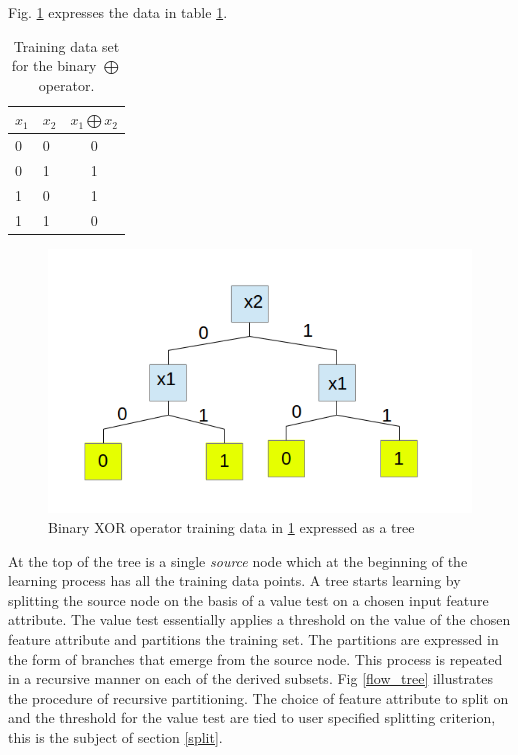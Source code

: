 \documentclass[final,3p,times,twocolumn]{elsarticle}
\begin{document}
Fig. \ref{simple_tree} expresses the data in table \ref{simple_train}. 

\begin{table}[ht]
\begin{center}
\begin{tabular}{l|l|c}
$x_{1}$ & $x_{2}$ & $ x_{1} \bigoplus x_{2}$\\
\hline
0 & 0 & 0 \\
0 & 1 & 1 \\ 
1 & 0 & 1 \\
1 & 1 & 0 
\end{tabular}
\end{center}
\caption{Training data set for the binary $\bigoplus$ operator.}
\label{simple_train}
\end{table}

\begin{figure}
\hspace{-1cm}
\includegraphics[scale=0.48]{Images/simple_tree.png}
\caption{Binary XOR operator training data in \ref{simple_train} expressed as a tree}
\label{simple_tree}
\end{figure}

At the top of the tree is a single \textit{source} node which at the beginning of the learning process has all the training data points. A tree starts learning by splitting the source node on the basis of a value test on a chosen input feature attribute. The value test essentially applies a threshold on the value of the chosen feature attribute and   partitions the training set. The partitions are expressed in the form of branches that emerge from the source node. This process is repeated in a recursive manner on each of the derived subsets. Fig \ref{flow_tree} illustrates the procedure of recursive partitioning. The choice of feature attribute to split on and the threshold for the value test are tied to user specified splitting criterion, this is the subject of section \ref{split}.
 
\end{document}
